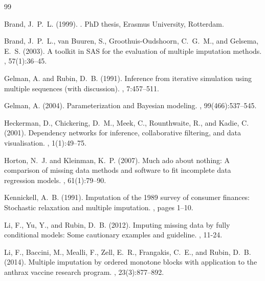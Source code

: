 \documentclass[
]{book}
\begin{document}
\begin{thebibliography}{99}

Brand, J.~P.~L. (1999).
.
\newblock PhD thesis, Erasmus University, Rotterdam.

Brand, J.~P.~L., {van Buuren}, S., Groothuis-Oudshoorn, C.~G.~M., and Gelsema, E.~S. (2003).
\newblock A toolkit in {SAS} for the evaluation of multiple imputation methods.
, 57(1):36--45.

Gelman, A. and Rubin, D.~B. (1991).
\newblock Inference from iterative simulation using multiple sequences (with discussion).
, 7:457--511.

Gelman, A. (2004).
\newblock Parameterization and {B}ayesian modeling.
, 99(466):537--545.

Heckerman, D., Chickering, D.~M., Meek, C., Rounthwaite, R., and Kadie, C. (2001).
\newblock Dependency networks for inference, collaborative filtering, and data visualisation.
, 1(1):49--75.

Horton, N.~J. and Kleinman, K.~P. (2007).
\newblock Much ado about nothing: A comparison of missing data methods and software to fit incomplete data regression models.
, 61(1):79--90.

Kennickell, A.~B. (1991).
\newblock Imputation of the 1989 survey of consumer finances: Stochastic relaxation and multiple imputation.
, pages 1--10.

Li, F., Yu, Y., and Rubin, D.~B. (2012).
\newblock Imputing missing data by fully conditional models: Some cautionary examples and guideline.
, 11-24.

Li, F., Baccini, M., Mealli, F., Zell, E.~R., Frangakis, C.~E., and Rubin, D.~B. (2014).
\newblock Multiple imputation by ordered monotone blocks with application to the anthrax vaccine research program.
, 23(3):877--892.


\end{thebibliography}
\end{document}

